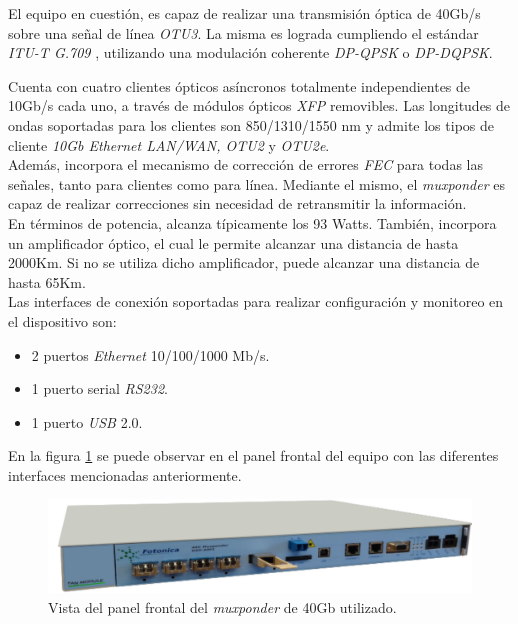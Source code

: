 El equipo en cuestión, es capaz de realizar una transmisión óptica de 40Gb/s sobre una señal de línea \textit{OTU3}. La misma es lograda cumpliendo el estándar \textit{ITU-T G.709} \parencite{itu7}, utilizando una modulación coherente \textit{DP-QPSK} o \textit{DP-DQPSK}.

Cuenta con cuatro clientes ópticos asíncronos totalmente independientes de 10Gb/s cada uno, a través de módulos ópticos  \textit{XFP} removibles. Las longitudes de ondas soportadas para los clientes son 850/1310/1550 nm y admite los tipos de cliente \textit{10Gb Ethernet LAN/WAN, OTU2} y \textit{OTU2e}.
\\

Además, incorpora el mecanismo de corrección de errores \textit{FEC} para todas las señales, tanto para clientes como para línea. Mediante el mismo, el \textit{muxponder} es capaz de realizar correcciones sin necesidad de retransmitir la información.
\\

En términos de potencia, alcanza típicamente los 93 Watts. También, incorpora un amplificador óptico, el cual le permite alcanzar una distancia de hasta 2000Km. Si no se utiliza dicho amplificador, puede alcanzar una distancia de hasta 65Km.
\\

Las interfaces de conexión soportadas para realizar configuración y monitoreo en el dispositivo son: 
\begin{itemize}
	\item 2 puertos \textit{Ethernet} 10/100/1000 Mb/s.
	\item 1 puerto serial \textit{RS232}.
	\item 1 puerto \textit{USB} 2.0.
\end{itemize}

En la figura \ref{fig:mux40} se puede observar en el panel frontal del equipo con las diferentes interfaces mencionadas anteriormente.


\begin{figure}[H]
	\centering
	\includegraphics[scale=0.7]{Figures/mux40.pdf}
	\caption{Vista del panel frontal del \textit{muxponder} de 40Gb utilizado.}
	\label{fig:mux40}
  \end{figure}

